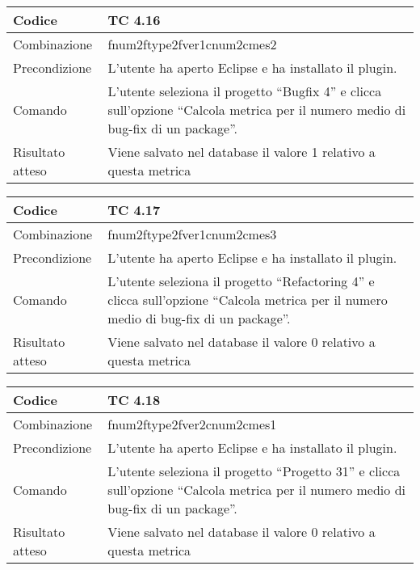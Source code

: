 \begin{table}[ht]
\begin{tabular}{|p{3cm}|p{9cm}|}
\hline
\cellcolor{lightgray}Codice				& TC 4.16								\\
\hline
\cellcolor{lightgray}Combinazione		& fnum2ftype2fver1cnum2cmes2								\\
\hline
\cellcolor{lightgray}Precondizione		& L'utente ha aperto Eclipse e ha installato il plugin.				\\
\hline
\cellcolor{lightgray}Comando			& L'utente seleziona il progetto ``Bugfix 4''  e clicca sull'opzione ``Calcola metrica per il numero medio di bug-fix di un package''.	\\
\hline
\cellcolor{lightgray}Risultato atteso	& Viene salvato nel database il valore 1 relativo a questa metrica	\\
\hline
\end{tabular}
\end{table}

\begin{table}[ht]
\begin{tabular}{|p{3cm}|p{9cm}|}
\hline
\cellcolor{lightgray}Codice				& TC 4.17								\\
\hline
\cellcolor{lightgray}Combinazione		& fnum2ftype2fver1cnum2cmes3							\\
\hline
\cellcolor{lightgray}Precondizione		& L'utente ha aperto Eclipse e ha installato il plugin.									\\
\hline
\cellcolor{lightgray}Comando			& L'utente seleziona il progetto ``Refactoring 4''  e clicca sull'opzione ``Calcola metrica per il numero medio di bug-fix di un package''.	\\
\hline
\cellcolor{lightgray}Risultato atteso	& Viene salvato nel database il valore 0 relativo a questa metrica	\\
\hline
\end{tabular}
\end{table}

\begin{table}[ht]
\begin{tabular}{|p{3cm}|p{9cm}|}
\hline
\cellcolor{lightgray}Codice				& TC 4.18								\\
\hline
\cellcolor{lightgray}Combinazione		& fnum2ftype2fver2cnum2cmes1 									\\
\hline
\cellcolor{lightgray}Precondizione		& L'utente ha aperto Eclipse e ha installato il plugin.				\\
\hline
\cellcolor{lightgray}Comando			& L'utente seleziona il progetto ``Progetto 31''  e clicca sull'opzione ``Calcola metrica per il numero medio di bug-fix di un package''.	\\
\hline
\cellcolor{lightgray}Risultato atteso	& Viene salvato nel database il valore 0 relativo a questa metrica	\\
\hline
\end{tabular}
\end{table}

